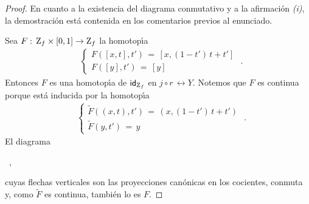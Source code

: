 \begin{proof}
	En cuanto a la existencia del diagrama conmutativo y a la
	afirmaci\'{o}n \emph{(i)}, la demostraci\'{o}n est\'{a} contenida en
	los comentarios previos al enunciado.

	Sea $F:\,\cilindro{f}\times\intervalo\rightarrow\cilindro{f}$ la
	homotop\'{\i}a
	\begin{align*}
		& \begin{cases}
			F([x,t],t') \,=\,[x,(1-t')\,t+t'] \\
			F([y],t') \,=\,[y]
		\end{cases}
		\text{ .}
	\end{align*}
	Entonces $F$ es una homotop\'{\i}a de $\id[\cilindro{f}]$ en
	$j\circ r\,\rel{Y}$. Notemos que $F$ es continua porque est\'{a}
	inducida por la homotop\'{\i}a
	\begin{align*}
		& \begin{cases}
			\tilde{F}((x,t),t') \,=\,(x,(1-t')\,t+t') \\
			\tilde{F}(y,t') \,=\,y
		\end{cases}
		\text{ .}
	\end{align*}
	El diagrama
	\begin{center}
	~,
	\end{center}
	cuyas flechas verticales son las proyecciones can\'{o}nicas en los
	cocientes, conmuta y, como $\tilde{F}$ es continua, tambi\'{e}n lo es
	$F$.


\end{proof}

